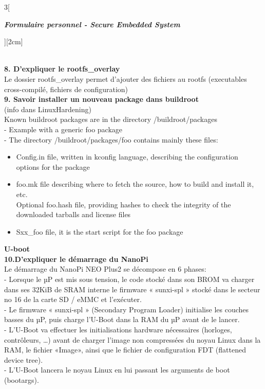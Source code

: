 \begin{multicols}{3}[\centerline{ \large\em \textbf{Formulaire personnel - Secure Embedded System}}][2cm]
\begin{minipage}{\linewidth}
\end{minipage}
\\ \textbf{8. D’expliquer le rootfs\_overlay\\}
Le dossier rootfs\_overlay permet d’ajouter des fichiers
au rootfs (executables cross-compilé, fichiers de configuration)
\\ \textbf{9. Savoir installer un nouveau package dans buildroot\\}
(info dans LinuxHardening)\\
Known buildroot packages are in the directory /buildroot/packages\\
- Example with a generic foo package\\
- The directory /buildroot/packages/foo contains mainly these files:
\begin{itemize}
\item Config.in file, written in kconfig language, describing the configuration options for the package
\item foo.mk file describing where to fetch the source, how to build and install it, etc. \\
Optional foo.hash file, providing hashes to check the integrity of the
downloaded tarballs and license files
\item Sxx\_foo file, it is the start script for the foo package
\end{itemize}
{\Large \textbf{U-boot}}
\\ \textbf{10.D'expliquer le démarrage du NanoPi\\}
Le démarrage du NanoPi NEO Plus2 se décompose en 6 phases:\\
- Lorsque le µP est mis sous tension, le code stocké dans son BROM va charger
dans ses 32KiB de SRAM interne le firmware « sunxi-spl » stocké dans le
secteur no 16 de la carte SD / eMMC et l’exécuter.\\
- Le firmware « sunxi-spl » (Secondary Program Loader) initialise les couches
basses du µP, puis charge l’U-Boot dans la RAM du µP avant de le lancer.\\
- L’U-Boot va effectuer les initialisations hardware nécessaires (horloges,
contrôleurs, …) avant de charger l’image non compressées du noyau Linux dans
la RAM, le fichier «Image», ainsi que le fichier de configuration FDT (flattened device tree).\\
- L’U-Boot lancera le noyau Linux en lui passant les arguments de boot (bootargs).\\

\end{multicols}
